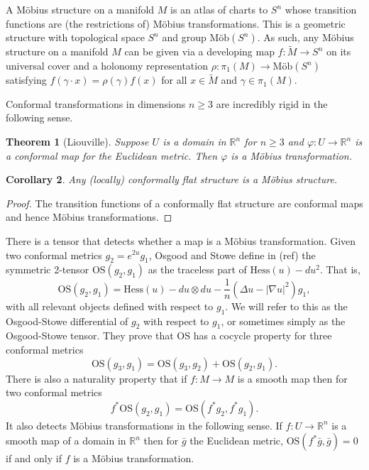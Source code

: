 \documentclass{amsart}
\newcommand{\R}{\mathbb{R}}
\newtheorem{thm}{Theorem}[section]
\newtheorem{cor}[thm]{Corollary}
\begin{document}
A M\"obius structure on a manifold $M$ is an atlas of charts to $S^n$ whose transition functions are (the restrictions of) M\"obius transformations.
This is a geometric structure with topological space $S^n$ and group $\text{M\"ob}(S^n)$. 
As such, any M\"obius structure on a manifold $M$ can be given via a developing map $f: \tilde{M} \to S^n$ on its universal cover and a holonomy representation $\rho: \pi_1(M) \to \text{M\"ob}(S^n)$ satisfying $f(\gamma \cdot x) = \rho(\gamma)f(x)$ for all $x \in \tilde{M}$ and $\gamma \in \pi_1(M)$.

Conformal transformations in dimensions $n \geq 3$ are incredibly rigid in the following sense. 

\begin{thm}[Liouville]
Suppose $U$ is a domain in $\R^n$ for $n \geq 3$ and $\varphi: U \to \R^n$ is a conformal map for the Euclidean metric. Then $\varphi$ is a M\"obius transformation.
\end{thm}

\begin{cor}
Any (locally) conformally flat structure is a M\"obius structure. 
\end{cor}
\begin{proof}
The transition functions of a conformally flat structure are conformal maps and hence M\"obius transformations.
\end{proof}

There is a tensor that detects whether a map is a M\"obius transformation. 
Given two conformal metrics $g_2 = e^{2u}g_1$, Osgood and Stowe define in (ref) the symmetric 2-tensor $\mathrm{OS}(g_2,g_1)$ as the traceless part of $\mathrm{Hess}(u) - du^2$.
That is, 
\[
\mathrm{OS}(g_2,g_1) = \mathrm{Hess}(u)  - du\otimes du - \frac{1}{n}\left( \Delta u - |\nabla u|^2\right)g_1,
\]
with all relevant objects defined with respect to $g_1$.
We will refer to this as the Osgood-Stowe differential of $g_2$ with respect to $g_1$, or sometimes simply as the Osgood-Stowe tensor.
They prove that $\mathrm{OS}$ has a cocycle property for three conformal metrics
\[
\mathrm{OS}(g_3,g_1) = \mathrm{OS}(g_3,g_2) + \mathrm{OS}(g_2,g_1).
\]
There is also a naturality property that if $f: M \to M$ is a smooth map then for two conformal metrics
\[
f^*\mathrm{OS}(g_2,g_1) = \mathrm{OS}(f^*g_2,f^*g_1).
\]
It also detects M\"obius transformations in the following sense. 
If $f:U \to \R^n$ is a smooth map of a domain in $\R^n$ then for $\bar{g}$ the Euclidean metric, $\mathrm{OS}(f^*\bar{g},\bar{g}) = 0$ if and only if $f$ is a M\"obius transformation.
\end{document}
